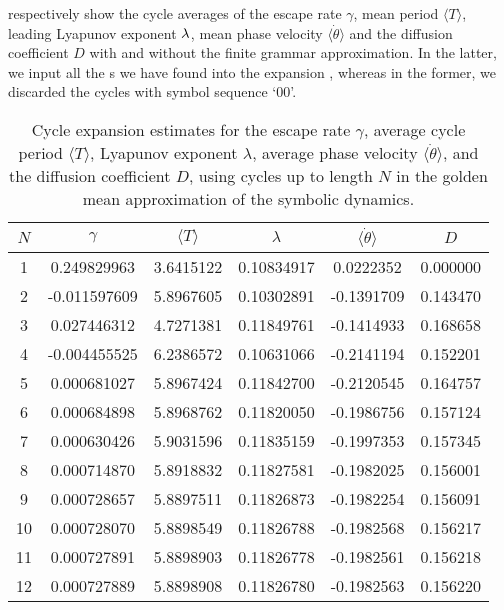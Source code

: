  respectively show
the cycle averages of the escape rate $\gamma$, mean period
$\langle T \rangle$, leading Lyapunov exponent $\lambda$, mean phase velocity
$\langle \dot{\theta} \rangle$ and the diffusion coefficient $D$
with and without the finite grammar approximation. In the latter, we input
all the \rpo s we have found into the expansion
, whereas in the former, we discarded the
cycles with symbol sequence `00'.
\begin{table}
    \caption{Cycle expansion estimates for
             the escape rate $\gamma$, average cycle period $\langle T \rangle$,
             Lyapunov exponent $\lambda$, average phase velocity
             $\langle \dot{\theta} \rangle$, and the diffusion coefficient $D$,
             using cycles up to length $N$ in the golden mean approximation
              of the symbolic dynamics.}
    \begin{tabular}{c|c|c|c|c|c}
     $N$ & $\gamma$ & $\langle T \rangle$ & $\lambda$ & $\langle \dot{\theta} \rangle$ & $D$ \\
    \hline
    1 & 0.249829963 & 3.6415122 & 0.10834917 & 0.0222352 & 0.000000 \\
    2 & -0.011597609 & 5.8967605 & 0.10302891 & -0.1391709 & 0.143470 \\
    3 & 0.027446312 & 4.7271381 & 0.11849761 & -0.1414933 &  0.168658 \\
    4 & -0.004455525 & 6.2386572 & 0.10631066 & -0.2141194 &  0.152201 \\
    5 & 0.000681027 & 5.8967424 & 0.11842700 & -0.2120545 &  0.164757 \\
    6 & 0.000684898 & 5.8968762 & 0.11820050 & -0.1986756 &  0.157124 \\
    7 & 0.000630426 & 5.9031596 & 0.11835159 & -0.1997353 &  0.157345 \\
    8 & 0.000714870 & 5.8918832 & 0.11827581 & -0.1982025 &  0.156001 \\
    9 & 0.000728657 & 5.8897511 & 0.11826873 & -0.1982254 &  0.156091 \\
    10 & 0.000728070 & 5.8898549 & 0.11826788 & -0.1982568 &  0.156217 \\
    11 & 0.000727891 & 5.8898903 & 0.11826778 & -0.1982561 &  0.156218 \\
    12 & 0.000727889 & 5.8898908 & 0.11826780 & -0.1982563 &  0.156220 \\
    \end{tabular}
    \label{t-DynamicalAverages}
\end{table}

